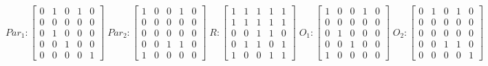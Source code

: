      $$
        Par_{1} : \begin{bmatrix}
            0 & 1 & 0 & 1 & 0 \\
            0 & 0 & 0 & 0 & 0 \\
            0 & 1 & 0 & 0 & 0 \\
			0 & 0 & 1 & 0 & 0 \\
            0 & 0 & 0 & 0 & 1 
        \end{bmatrix}
        \;
        Par_{2} : \begin{bmatrix}
            1 & 0 & 0 & 1 & 0 \\
            0 & 0 & 0 & 0 & 0 \\
            0 & 0 & 0 & 0 & 0 \\
            0 & 0 & 1 & 1 & 0 \\
            1 & 0 & 0 & 0 & 0
        \end{bmatrix}
        \;
        R : \begin{bmatrix}
            1 & 1 & 1 & 1 & 1 \\
            1 & 1 & 1 & 1 & 1 \\
            0 & 0 & 1 & 1 & 0 \\
            0 & 1 & 1 & 0 & 1 \\
            1 & 0 & 0 & 1 & 1
        \end{bmatrix}
        \;
        O_{1} : \begin{bmatrix}
            1 & 0 & 0 & 1 & 0 \\
            0 & 0 & 0 & 0 & 0 \\
            0 & 1 & 0 & 0 & 0 \\
            0 & 0 & 1 & 0 & 0 \\
            1 & 0 & 0 & 0 & 0
        \end{bmatrix}
        \;
        O_{2} : \begin{bmatrix}
            0 & 1 & 0 & 1 & 0 \\
            0 & 0 & 0 & 0 & 0 \\
            0 & 0 & 0 & 0 & 0 \\
            0 & 0 & 1 & 1 & 0 \\
            0 & 0 & 0 & 0 & 1
        \end{bmatrix}
    $$ 
